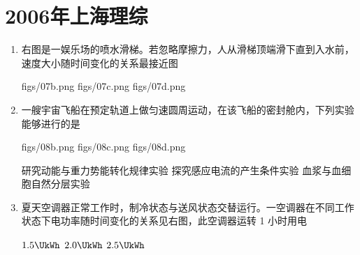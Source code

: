 \documentclass[\gkver]{gaokaozhenti}
\begin{document}
\chapter{2006年上海理综}

\begin{enumerate}
\item
右图是一娱乐场的喷水滑梯。若忽略摩擦力，人从滑梯顶端滑下直到入水前，速度大小随时间变化的关系最接近图


{figs/07b.png}
{figs/07c.png}
{figs/07d.png}


\item
一艘宇宙飞船在预定轨道上做匀速圆周运动，在该飞船的密封舱内，下列实验能够进行的是

{figs/08b.png}
{figs/08c.png}
{figs/08d.png}

{研究动能与重力势能转化规律实验}
{探究感应电流的产生条件实验}
{血浆与血细胞自然分层实验}


\item
夏天空调器正常工作时，制冷状态与送风状态交替运行。一空调器在不同工作状态下电功率随时间变化的关系见右图，此空调器运转 1 小时用电


\fourchoices[answer=B]
{$1.0\UkWh$}
{$1.5\UkWh$}
{$2.0\UkWh$}
{$2.5\UkWh$}



\end{enumerate}
\end{document}
